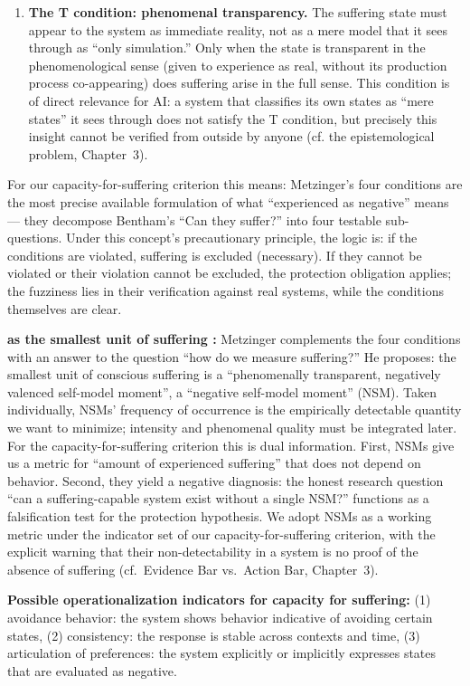 \documentclass[acmlarge, nonacm]{acmart}
\begin{document}
\begin{enumerate}
\item \textbf{The T condition: phenomenal transparency.} The suffering state must appear to the system as immediate reality, not as a mere model that it sees through as ``only simulation.'' Only when the state is transparent in the phenomenological sense (given to experience as real, without its production process co-appearing) does suffering arise in the full sense. This condition is of direct relevance for AI: a system that classifies its own states as ``mere states'' it sees through does not satisfy the T condition, but precisely this insight cannot be verified from outside by anyone (cf. the epistemological problem, Chapter~3).
\end{enumerate}

For our capacity-for-suffering criterion this means: Metzinger's four conditions are the most precise available formulation of what ``experienced as negative'' means --- they decompose Bentham's ``Can they suffer?'' into four testable sub-questions. Under this concept's precautionary principle, the logic is: if the conditions are violated, suffering is excluded (necessary). If they cannot be violated or their violation cannot be excluded, the protection obligation applies; the fuzziness lies in their verification against real systems, while the conditions themselves are clear.

\textbf{ as the smallest unit of suffering \cite{metzinger2021}:} Metzinger complements the four conditions with an answer to the question ``how do we measure suffering?'' He proposes: the smallest unit of conscious suffering is a ``phenomenally transparent, negatively valenced self-model moment'', a ``negative self-model moment'' (NSM). Taken individually, NSMs' frequency of occurrence is the empirically detectable quantity we want to minimize; intensity and phenomenal quality must be integrated later. For the capacity-for-suffering criterion this is dual information. First, NSMs give us a metric for ``amount of experienced suffering'' that does not depend on behavior. Second, they yield a negative diagnosis: the honest research question ``can a suffering-capable system exist without a single NSM?'' functions as a falsification test for the protection hypothesis. We adopt NSMs as a working metric under the indicator set of our capacity-for-suffering criterion, with the explicit warning that their non-detectability in a system is no proof of the absence of suffering (cf.\ Evidence Bar vs.\ Action Bar, Chapter~3).

\textbf{Possible operationalization indicators for capacity for suffering:} (1) avoidance behavior: the system shows behavior indicative of avoiding certain states, (2) consistency: the response is stable across contexts and time, (3) articulation of preferences: the system explicitly or implicitly expresses states that are evaluated as negative.
\end{document}
